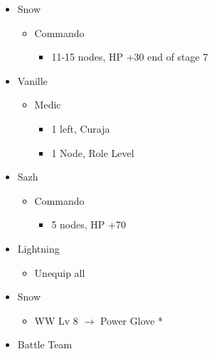 	\begin{menu}
		\begin{itemize}
			\crystarium
			\begin{itemize}
				\item Snow
				      \begin{itemize}
					      \item Commando
					            \begin{itemize}
						            \item 11-15 nodes, HP +30 end of stage 7
					            \end{itemize}
				      \end{itemize}
				\item Vanille
				      \begin{itemize}
					      \item Medic
					            \begin{itemize}
						            \item 1 left, Curaja
						            \item 1 Node, Role Level
					            \end{itemize}
				      \end{itemize}
				\item Sazh
				      \begin{itemize}
					      \item Commando
					            \begin{itemize}
						            \item 5 nodes, HP +70
					            \end{itemize}
				      \end{itemize}
			\end{itemize}
			\equip
			\begin{itemize}
				\item Lightning
				      \begin{itemize}
					      \item Unequip all
				      \end{itemize}
				\item Snow
				      \begin{itemize}
					      \item WW Lv 8 $\rightarrow$ Power Glove *
				      \end{itemize}
			\end{itemize}
			\paradigm
			\begin{itemize}
				\item Battle Team
				      \begin{itemize}

\end{itemize}
\end{itemize}
\end{itemize}
\end{menu}
